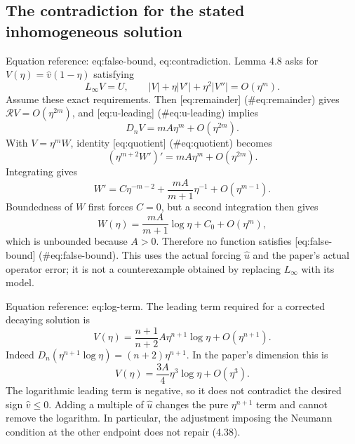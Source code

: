 \documentclass[10pt]{article}
\begin{document}
\subsection*{The contradiction for the stated inhomogeneous solution}
Equation reference: eq:false-bound, eq:contradiction. Lemma 4.8 asks for \(V(\eta)=\widehat v(1-\eta)\) satisfying \[L_\infty V=U,\qquad
 |V|+\eta|V'|+\eta^2|V''|=O(\eta^m).
 \] Assume these exact requirements. Then [eq:remainder] (\#eq:remainder) gives \(\mathcal RV=O(\eta^{2m})\), and [eq:u-leading] (\#eq:u-leading) implies \[D_nV=mA\eta^m+O(\eta^{2m}).\] With \(V=\eta^m W\), identity [eq:quotient] (\#eq:quotient) becomes \[(\eta^{m+2}W')'=mA\eta^m+O(\eta^{2m}).\] Integrating gives \[W'=C\eta^{-m-2}+\frac{mA}{m+1}\eta^{-1}+O(\eta^{m-1}).\] Boundedness of \(W\) first forces \(C=0\), but a second integration then gives \[W(\eta)=\frac{mA}{m+1}\log\eta+C_0+O(\eta^m),
 \] which is unbounded because \(A>0\). Therefore no function satisfies [eq:false-bound] (\#eq:false-bound). This uses the actual forcing \(\widehat u\) and the paper’s actual operator error; it is not a counterexample obtained by replacing \(L_\infty\) with its model.\par
Equation reference: eq:log-term. The leading term required for a corrected decaying solution is \[V(\eta)=\frac{n+1}{n+2}A\eta^{n+1}\log\eta+O(\eta^{n+1}).
 \] Indeed \(D_n(\eta^{n+1}\log\eta)=(n+2)\eta^{n+1}\). In the paper’s dimension this is \[V(\eta)=\frac{3A}{4}\eta^3\log\eta+O(\eta^3).\] The logarithmic leading term is negative, so it does not contradict the desired sign \(\widehat v\leq0\). Adding a multiple of \(\widehat u\) changes the pure \(\eta^{n+1}\) term and cannot remove the logarithm. In particular, the adjustment imposing the Neumann condition at the other endpoint does not repair (4.38).\par
\end{document}

